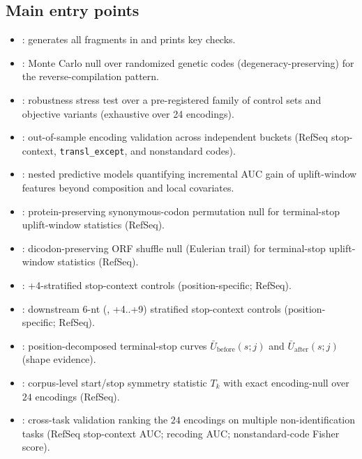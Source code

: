 \subsection{Main entry points}
\begin{itemize}
\item {}: generates all fragments in  and prints key checks.
\item {}: Monte Carlo null over randomized genetic codes (degeneracy-preserving) for the reverse-compilation pattern.
\item {}: robustness stress test over a pre-registered family of control sets and objective variants (exhaustive over 24 encodings).
\item {}: out-of-sample encoding validation across independent buckets (RefSeq stop-context, \texttt{transl\_except}, and nonstandard codes).
\item {}: nested predictive models quantifying incremental AUC gain of uplift-window features beyond composition and local covariates.
\item {}: protein-preserving synonymous-codon permutation null for terminal-stop uplift-window statistics (RefSeq).
\item {}: dicodon-preserving ORF shuffle null (Eulerian trail) for terminal-stop uplift-window statistics (RefSeq).
\item {}: +4-stratified stop-context controls (position-specific; RefSeq).
\item {}: downstream 6-nt (, +4..+9) stratified stop-context controls (position-specific; RefSeq).
\item {}: position-decomposed terminal-stop curves $\bar U_{\mathrm{before}}(s;j)$ and $\bar U_{\mathrm{after}}(s;j)$ (shape evidence).
\item {}: corpus-level start/stop symmetry statistic $T_k$ with exact encoding-null over $24$ encodings (RefSeq).
\item {}: cross-task validation ranking the $24$ encodings on multiple non-identification tasks (RefSeq stop-context AUC; recoding AUC; nonstandard-code Fisher score).

\end{itemize}
